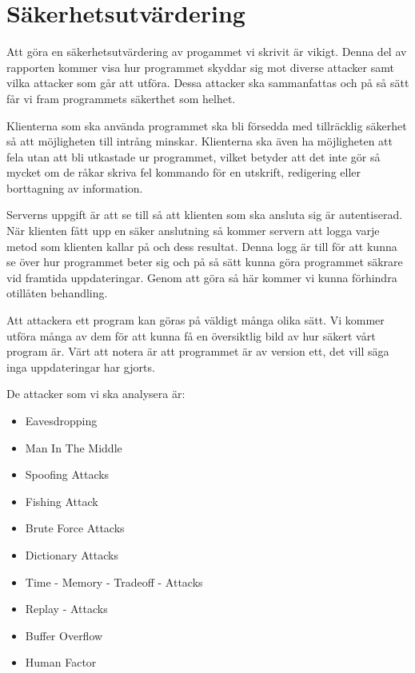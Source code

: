\section{Säkerhetsutvärdering}
Att göra en säkerhetsutvärdering av progammet vi skrivit är vikigt. Denna del av rapporten kommer visa hur programmet skyddar sig mot diverse attacker samt vilka attacker som går att utföra. Dessa attacker ska sammanfattas och på så sätt får vi fram programmets säkerthet som helhet. 

Klienterna som ska använda programmet ska bli försedda med tillräcklig säkerhet så att möjligheten till intrång minskar. Klienterna ska även ha möjligheten att fela utan att bli utkastade ur programmet, vilket betyder att det inte gör så mycket om de råkar skriva fel kommando för en utskrift, redigering eller borttagning av information.

Serverns uppgift är att se till så att klienten som ska ansluta sig är autentiserad. När klienten fått upp en säker anslutning så kommer servern att logga varje metod som klienten kallar på och dess resultat. Denna logg är till för att kunna se över hur programmet beter sig och på så sätt kunna göra programmet säkrare vid framtida uppdateringar. Genom att göra så här kommer vi kunna förhindra otillåten behandling.

Att attackera ett program kan göras på väldigt många olika sätt. Vi kommer utföra många av dem för att kunna få en översiktlig bild av hur säkert vårt program är. Värt att notera är att programmet är av version ett, det vill säga inga uppdateringar har gjorts. 

De attacker som vi ska analysera är:

\begin{itemize}
\item{Eavesdropping}
\item{Man In The Middle}
\item{Spoofing Attacks}
\item{Fishing Attack}
\item{Brute Force Attacks}
\item{Dictionary Attacks}
\item{Time - Memory - Tradeoff - Attacks}
\item{Replay - Attacks}
\item{Buffer Overflow}
\item{Human Factor}
\end{itemize}